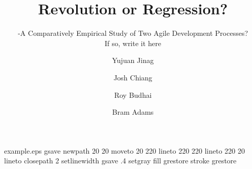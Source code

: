 %
%
%
%
%
\begin{filecontents*}{example.eps}
gsave
newpath
  20 20 moveto
  20 220 lineto
  220 220 lineto
  220 20 lineto
closepath
2 setlinewidth
gsave
  .4 setgray fill
grestore
stroke
grestore
\end{filecontents*}
%
\RequirePackage{fix-cm}
%
\documentclass[smallextended]{svjour3}       %
%
\smartqed  %
%
\usepackage{graphicx}
%
%
%
%
%

\usepackage[tight,footnotesize]{subfigure}


\title{Revolution or Regression?%
}
\subtitle{-A Comparatively Empirical Study of Two Agile Development Processes?\\ If so, write it here}


\author{Yujuan Jinag         \and
         Josh Chiang \and
	Roy Budhai \and
	Bram Adams %
}

